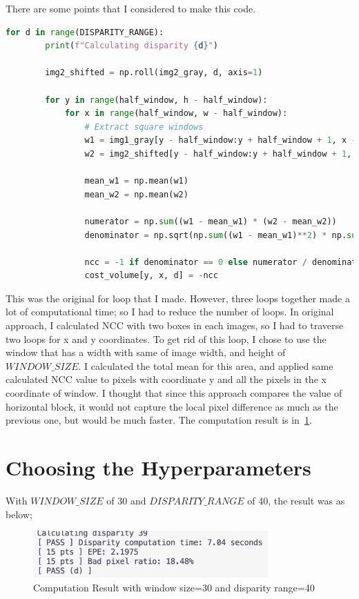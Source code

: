 There are some points that I considered to make this code.
\begin{lstlisting}[language=python]
    for d in range(DISPARITY_RANGE):
        print(f"Calculating disparity {d}")

        img2_shifted = np.roll(img2_gray, d, axis=1)

        for y in range(half_window, h - half_window):
            for x in range(half_window, w - half_window):
                # Extract square windows
                w1 = img1_gray[y - half_window:y + half_window + 1, x - half_window:x + half_window + 1]
                w2 = img2_shifted[y - half_window:y + half_window + 1, x - half_window:x + half_window + 1]
                
                mean_w1 = np.mean(w1)
                mean_w2 = np.mean(w2)
                
                numerator = np.sum((w1 - mean_w1) * (w2 - mean_w2))
                denominator = np.sqrt(np.sum((w1 - mean_w1)**2) * np.sum((w2 - mean_w2)**2))

                ncc = -1 if denominator == 0 else numerator / denominator
                cost_volume[y, x, d] = -ncc
\end{lstlisting}

This was the original for loop that I made. However, three loops together made a lot of computational time; so I had to reduce the number of loops.
In original approach, I calculated NCC with two boxes in each images, so I had to traverse two loops for x and y coordinates. To get rid of this loop, I chose to use the window that has a width with same of image width, and height of $WINDOW\_SIZE$. I calculated the total mean for this area, and applied same calculated NCC value to pixels with coordinate y and all the pixels in the x coordinate of window.
I thought that since this approach compares the value of horizontal block, it would not capture the local pixel difference as much as the previous one, but would be much faster. The computation result is in~\ref{fig:result2}.

\section*{Choosing the Hyperparameters}
With $WINDOW\_SIZE$ of 30 and $DISPARITY\_RANGE$ of 40, the result was as below;
\begin{figure}[h]
    \centering
    \includegraphics[width=9cm]{../result/result_1.png}
    \caption{Computation Result with window size=30 and disparity range=40}
    \label{fig:result2}
\end{figure}


